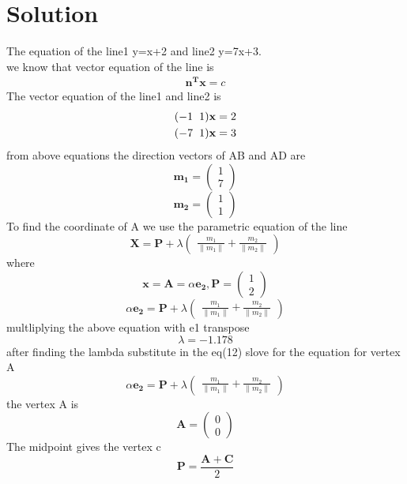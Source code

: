 \documentclass[journal,10pt,twocolumn]{article}
\let\vec\mathbf
\newcommand{\myvec}[1]{\ensuremath{\begin{pmatrix}#1\end{pmatrix}}}
\begin{document}
\section*{\large Solution}
The equation of the line1 y=x+2 and line2 y=7x+3.
\\we know that vector equation of the line is 
\begin{eqnarray}
 \vec{n^T}\vec{x}=c
\end{eqnarray}
The vector equation of the line1 and line2 is
\begin{eqnarray}
  (-1\hspace{2mm}1)\vec{x}=2
 \\(-7\hspace{2mm}1)\vec{x}=3
\end{eqnarray}
from above equations the direction vectors of AB and AD are 
\begin{equation}
\vec{m_1}=\myvec{1\\7}
\end{equation}
\begin{equation}
\vec{m_2}=\myvec{1\\1}
\end{equation}
To find the coordinate of A we use the parametric equation of the line 
\begin{equation}
\vec{X}=\vec{P}+\lambda\myvec{\frac{m_1}{\|m_1\|}+\frac{m_2}{\|m_2\|}}
\end{equation}
where
\begin{equation}
 \vec{x}=\vec{A}=\alpha\vec{e_2},
 \vec{P}=\myvec{1\\2}
\end{equation}
\begin{equation}
\alpha\vec{e_2}=\vec{P} + \lambda\myvec{\frac{m_1}{\|m_1\|}+\frac{m_2}{\|m_2\|}}
\end{equation}
multliplying the above equation with e1 transpose
\begin{equation}
\lambda = -1.178
\end{equation}
after finding the lambda substitute in the eq(12) slove for the equation for vertex A
\begin{equation}
\alpha\vec{e_2} = \vec{P} + \lambda\myvec{\frac{m_1}{\|m_1\|}+\frac{m_2}{\|m_2\|}}
\end{equation}
the vertex A is 
\begin{equation}
\vec{A}=\myvec{0\\0}
\end{equation}
The midpoint gives the vertex c
\begin{equation}
\vec{P} = \frac{\vec{A}+\vec{C}}{2}
\end{equation}
\end{document}
